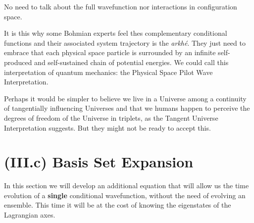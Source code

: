 \documentclass[11pt, a4paper]{article} %
\begin{document}
No need to talk about the full wavefunction nor interactions in configuration space.

It is this why some Bohmian experts feel thes complementary conditional functions and  their associated system trajectory is the {\em arkhé}. They just need to embrace that each physical space particle is surrounded by an infinite self-produced and self-sustained chain of potential energies. We could call this interpretation of quantum mechanics: the Physical Space Pilot Wave Interpretation.

Perhaps it would be simpler to believe we live in a Universe among a continuity of tangentially influencing Universes and that we humans happen to perceive the degrees of freedom of the Universe in triplets, as the Tangent Universe Interpretation suggests. But they might not be ready to accept this.
\vspace{-0.25cm}

\section*{(III.c) Basis Set Expansion\vspace{-0.2cm}}
In this section we will develop an additional equation that will allow us the time evolution of a {\bf single} conditional wavefunction, without the need of evolving an ensemble. This time it will be at the cost of knowing the eigenstates of the Lagrangian axes.
\end{document}
